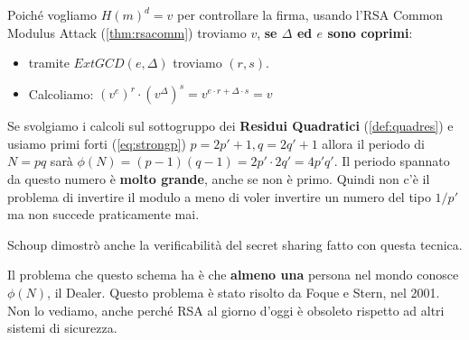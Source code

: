 \begin{definition}
\begin{remark}
Poiché vogliamo $H(m)^d=v$ per controllare la firma, usando l'RSA Common Modulus Attack (\cref{thm:rsacomm}) troviamo $v$, \textbf{se $\Delta$ ed $e$ sono coprimi\footnotemark}:
\begin{itemize}
    \item tramite $ExtGCD(e,\Delta)$ troviamo $(r,s)$.
    \item Calcoliamo: $(v^{e})^r\cdot (v^{\Delta})^s=v^{e\cdot r+\Delta\cdot s}=v$
\end{itemize}
\end{remark}
\end{definition}
\begin{remark}Se svolgiamo i calcoli sul sottogruppo dei \textbf{Residui Quadratici} (\cref{def:quadres}) e usiamo primi forti (\cref{eq:strongp}) $p=2p'+1,q=2q'+1$ allora il periodo di $N=pq$ sarà $\phi(N)=(p-1)(q-1)=2p'\cdot2q'=4p'q'$. Il periodo spannato da questo numero è \textbf{molto grande}, anche se non è primo. Quindi non c'è il problema di invertire il modulo a meno di voler invertire un numero del tipo $1/p'$ ma non succede praticamente mai.
\end{remark}
\begin{note}
Schoup dimostrò anche la verificabilità del secret sharing fatto con questa tecnica.
\end{note}
\begin{note}
Il problema che questo schema ha è che \textbf{almeno una} persona nel mondo conosce $\phi(N)$, il Dealer. Questo problema è stato risolto da Foque e Stern, nel 2001. Non lo vediamo, anche perché RSA al giorno d'oggi è obsoleto rispetto ad altri sistemi di sicurezza.
\end{note}
